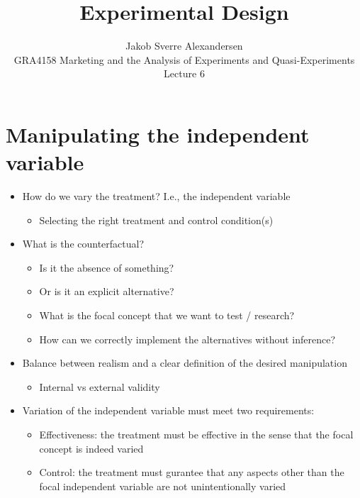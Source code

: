 \documentclass[10pt]{article}
\begin{document}
 
\title{Experimental Design}
\author{Jakob Sverre Alexandersen\\
GRA4158 Marketing and the Analysis of Experiments and Quasi-Experiments\\
Lecture 6}
\maketitle

\tableofcontents
\newpage
\section{Manipulating the independent variable}
\begin{itemize}
    \item How do we vary the treatment? I.e., the independent variable 
    \begin{itemize}
        \item Selecting the right treatment and control condition(s)
    \end{itemize}
    \item What is the counterfactual?
    \begin{itemize}
        \item Is it the absence of something?
        \item Or is it an explicit alternative?
        \item What is the focal concept that we want to test / research?
        \item How can we correctly implement the alternatives without inference?
    \end{itemize}
    \item Balance between realism and a clear definition of the desired manipulation
    \begin{itemize}
        \item Internal vs external validity
    \end{itemize}
    \item Variation of the independent variable must meet two requirements: 
    \begin{itemize}
        \item Effectiveness: the treatment must be effective in the sense that the focal concept is indeed varied 
        \item Control: the treatment must gurantee that any aspects other than the focal independent variable are not unintentionally varied 
    \end{itemize}
\end{itemize}
\end{document}
